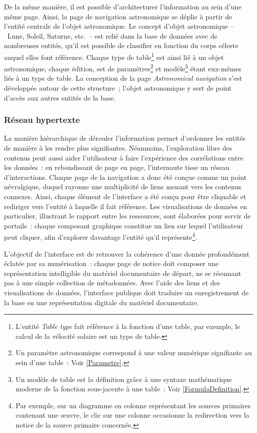 \documentclass[a4paper,12pt,twoside]{book}
\newcommand{\eng}{\emph}
\newcommand{\bdd}{base de données\xspace}
\begin{document}
De la même manière, il est possible d'architecturer l'information au sein d'une même page. Ainsi, la page de navigation astronomique se déplie à partir de l'entité centrale de l'objet astronomique. Le concept d'objet astronomique –~Lune, Soleil, Saturne, etc.~– est relié dans la \bdd avec de nombreuses entités, qu'il est possible de classifier en fonction du corps céleste auquel elles font référence. Chaque type de table\footnote{L'entité \eng{Table type} fait référence à la fonction d'une table, par exemple, le calcul de la vélocité solaire est un type de table.} est ainsi lié à un objet astronomique, chaque édition, set de paramètres\footnote{Un paramètre astronomique correspond à une valeur numérique signifiante au sein d'une table~: Voir \ref{Parametre}.} et modèle\footnote{Un modèle de table est la définition grâce à une syntaxe mathématique moderne de la fonction sous-jacente à une table~: Voir \ref{FormulaDefinition}.} étant eux-mêmes liés à un type de table. La conception de la page \eng{Astronomical navigation} s'est développée autour de cette structure~; l'objet astronomique y sert de point d'accès aux autres entités de la base.

			\subsubsection{Réseau hypertexte\label{Reseau-hypertexte}}
La manière hiérarchique de dérouler l'information permet d'ordonner les entités de manière à les rendre plus signifiantes. Néanmoins, l'exploration libre des contenus peut aussi aider l'utilisateur à faire l'expérience des corrélations entre les données~: en rebondissant de page en page, l'internaute tisse un réseau d'interactions. Chaque page de la navigation a donc été conçue comme un point névralgique, duquel rayonne une multiplicité de liens menant vers les contenus connexes. Ainsi, chaque élément de l'interface a été conçu pour être cliquable et rediriger vers l'entité à laquelle il fait référence. Les visualisations de données en particulier, illustrant le rapport entre les ressources, sont élaborées pour servir de portails~: chaque composant graphique constitue un lien sur lequel l'utilisateur peut cliquer, afin d'explorer davantage l'entité qu'il représente\footnote{Par exemple, sur un diagramme en colonne représentant les sources primaires contenant une œuvre, le clic sur une colonne occasionne la redirection vers la notice de la source primaire concernée.}.

L'objectif de l'interface est de retrouver la cohérence d'une donnée profondément éclatée par sa numérisation~: chaque page de notice doit composer une représentation intelligible du matériel documentaire de départ, ne se résumant pas à une simple collection de métadonnées. Avec l'aide des liens et des visualisations de données, l'interface publique doit traduire un enregistrement de la base en une représentation digitale du matériel documentaire.
\end{document}
